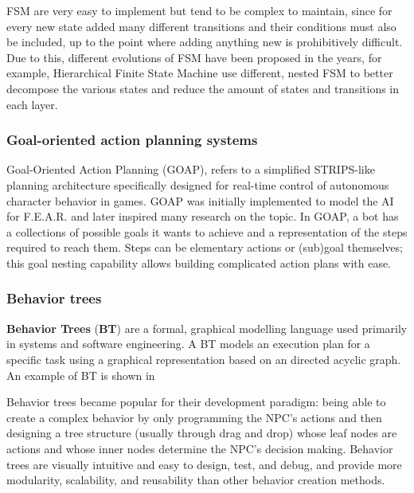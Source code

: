 FSM are very easy to implement but tend to be complex to maintain, since for every new state added many different transitions and their conditions must also be included, up to the point where adding anything new is prohibitively difficult.
Due to this, different evolutions of FSM have been proposed in the years, for example, Hierarchical Finite State Machine use different, nested FSM to better decompose the various states and reduce the amount of states and transitions in each layer.

\subsubsection{Goal-oriented action planning systems}
Goal-Oriented Action Planning (GOAP), refers to a simplified STRIPS-like planning architecture specifically designed for real-time control of autonomous character behavior in games. GOAP was initially implemented to model the AI for F.E.A.R. and later inspired many research on the topic. In GOAP, a bot has a collections of possible goals it wants to achieve and a representation of the steps required to reach them. Steps can be elementary actions or (sub)goal themselves; this goal nesting capability allows building complicated action plans with ease.

\subsubsection{Behavior trees}
\textbf{Behavior Trees} (\textbf{BT}) are a formal, graphical modelling language used primarily in systems and software engineering. A BT models an execution plan for a specific task using a graphical representation based on an directed acyclic graph. An example of BT is shown in 

Behavior trees became popular for their development paradigm: being able to create a complex behavior by only programming the NPC's actions and then designing a tree structure (usually through drag and drop) whose leaf nodes are actions and whose inner nodes determine the NPC's decision making. Behavior trees are visually intuitive and easy to design, test, and debug, and provide more modularity, scalability, and reusability than other behavior creation methods. 

